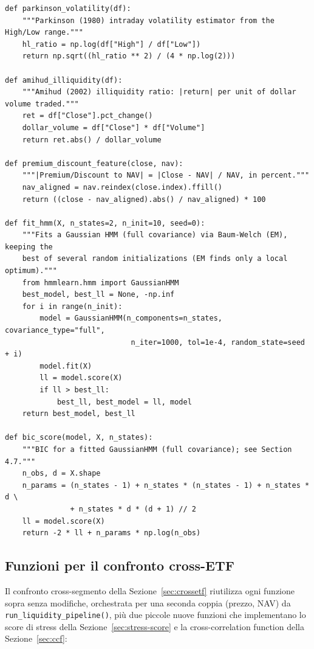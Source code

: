 \documentclass[11pt]{article}
\theoremstyle{definition}
\theoremstyle{remark}
\begin{document}
\begin{lstlisting}
def parkinson_volatility(df):
    """Parkinson (1980) intraday volatility estimator from the High/Low range."""
    hl_ratio = np.log(df["High"] / df["Low"])
    return np.sqrt((hl_ratio ** 2) / (4 * np.log(2)))

def amihud_illiquidity(df):
    """Amihud (2002) illiquidity ratio: |return| per unit of dollar volume traded."""
    ret = df["Close"].pct_change()
    dollar_volume = df["Close"] * df["Volume"]
    return ret.abs() / dollar_volume

def premium_discount_feature(close, nav):
    """|Premium/Discount to NAV| = |Close - NAV| / NAV, in percent."""
    nav_aligned = nav.reindex(close.index).ffill()
    return ((close - nav_aligned).abs() / nav_aligned) * 100

def fit_hmm(X, n_states=2, n_init=10, seed=0):
    """Fits a Gaussian HMM (full covariance) via Baum-Welch (EM), keeping the
    best of several random initializations (EM finds only a local optimum)."""
    from hmmlearn.hmm import GaussianHMM
    best_model, best_ll = None, -np.inf
    for i in range(n_init):
        model = GaussianHMM(n_components=n_states, covariance_type="full",
                             n_iter=1000, tol=1e-4, random_state=seed + i)
        model.fit(X)
        ll = model.score(X)
        if ll > best_ll:
            best_ll, best_model = ll, model
    return best_model, best_ll

def bic_score(model, X, n_states):
    """BIC for a fitted GaussianHMM (full covariance); see Section 4.7."""
    n_obs, d = X.shape
    n_params = (n_states - 1) + n_states * (n_states - 1) + n_states * d \
               + n_states * d * (d + 1) // 2
    ll = model.score(X)
    return -2 * ll + n_params * np.log(n_obs)
\end{lstlisting}

\subsection{Funzioni per il confronto cross-ETF}
\label{sec:appendix-crossetf}

Il confronto cross-segmento della Sezione~\ref{sec:crossetf} riutilizza ogni funzione sopra senza modifiche, orchestrata per una seconda coppia (prezzo, NAV) da \texttt{run\_liquidity\_pipeline()}, pi\`u due piccole nuove funzioni che implementano lo score di stress della Sezione~\ref{sec:stress-score} e la cross-correlation function della Sezione~\ref{sec:ccf}:
\end{document}
